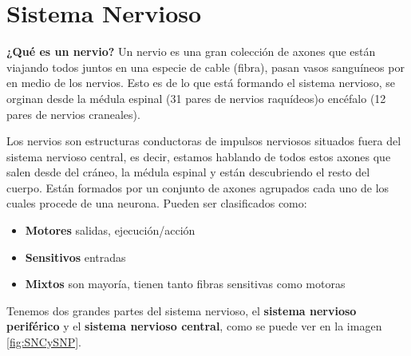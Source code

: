 \section{Sistema Nervioso}


\textbf{¿Qué es un nervio?}
Un nervio es una gran colección de axones que están viajando todos juntos en una especie de cable (fibra), pasan vasos sanguíneos por en medio de los nervios. Esto es de lo que está formando el sistema nervioso, se orginan desde  la médula espinal (31 pares de nervios raquídeos)o encéfalo (12 pares de nervios craneales).

Los nervios son estructuras conductoras de impulsos nerviosos situados fuera del sistema nervioso central, es decir, estamos hablando de todos estos axones que salen desde del cráneo, la médula espinal y están descubriendo el resto del cuerpo.
Están formados por un conjunto de axones agrupados cada uno de los cuales procede de una neurona. Pueden ser clasificados como:

\begin{itemize}
\item \textbf{Motores} salidas, ejecución/acción  
\item \textbf{Sensitivos} entradas 
\item \textbf{Mixtos} son mayoría, tienen tanto fibras sensitivas como motoras
\end{itemize}


Tenemos dos grandes partes del sistema nervioso, el \textbf{sistema nervioso periférico} y el \textbf{sistema nervioso central}, como se puede ver en la imagen \ref{fig:SNCySNP}. 

